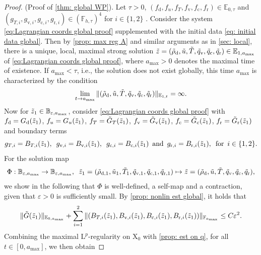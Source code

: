 \documentclass[10pt]{amsart}
\theoremstyle{plain}
\theoremstyle{definition}
\theoremstyle{thm}
\numberwithin{equation}{section}
\newcommand{\rL}{\mathrm{L}}
\newcommand{\rLp}{\rL^p}
\newcommand{\rX}{\mathrm{X}}
\newcommand{\E}{\mathbb{E}}
\newcommand{\F}{\mathbb{F}}
\newcommand{\eps}{\varepsilon}
\newcommand{\tand}{\enspace \text{and} \enspace}
\newcommand{\tfor}{\enspace \text{for} \enspace}
\newcommand{\rd}{\mathrm{d}}
\newcommand{\rr}{\mathrm{r}}
\newcommand{\rv}{\mathrm{v}}
\newcommand{\rc}{\mathrm{c}}
\newcommand{\trho}{\Tilde{\rho}}
\newcommand{\tu}{\Tilde{u}}
\newcommand{\tz}{\Tilde{z}}
\newcommand{\tT}{\Tilde{T}}
\newcommand{\tq}{\Tilde{q}}
\begin{document}
\begin{proof}{(Proof of \autoref{thm: global WP}).}
Let $\tau>0$, $(f_\rd, f_u, f_T,f_\rv,f_\rc,f_\rr) \in \E_{0,\tau}$ and $(g_{T,i},g_{\rv,i},g_{\rc,i},g_{\rr,i}) \in (\F_{h,\tau})^4$ for $i \in \{1,2\}$ . 
Consider the system \eqref{eq:Lagrangian coords global proof}  supplemented with the initial data \eqref{eq: initial data global}. 
Then by \autoref{prop: max reg A} and similar arguments as in \autoref{sec: local}, there is a unique, local, maximal strong solution $\tz = (\trho_\rd,\tu,\tT,\tq_\rv,\tq_\rc,\tq_\rr) \in \E_{1,a_\mathrm{max}}$ of \eqref{eq:Lagrangian coords global proof}, where $a_{\mathrm{max}}>0$ denotes the maximal time of existence. 
If $a_{\mathrm{max}} < \tau$, i.e., the solution does not exist globally, this time $a_{\mathrm{max}}$ is characterized by the condition
\begin{equation*}
    \lim\limits_{t \to a_{\mathrm{max}}} \| (\trho_\rd,\tu,\tT,\tq_\rv,\tq_\rc,\tq_\rr) \|_{\E_{1,t}} = \infty.
\end{equation*}
Now for $\tz_1 \in \mathbb{B}_{\eps,a_{\mathrm{max}}} $, consider \eqref{eq:Lagrangian coords global proof} with $f_{\rd} = G_\rd(\tz_1)$, $f_{u} = G_u(\tz_1)$, $f_T = \Tilde{G}_T(\tz_1)$, $f_\rv = \Tilde{G}_\rv(\tz_1)$, $f_\rc = \Tilde{G}_{\rc}(\tz_1)$, $f_\rr = \Tilde{G}_\rr(\tz_1)$ and boundary terms 
\begin{equation*}
    g_{T,i} = B_{T,i}(\tz_1), \enspace g_{\rv,i} = B_{\rv,i}(\tz_1), \enspace g_{\rc,i} = B_{\rc,i}(\tz_1) \tand g_{\rr,i} = B_{\rr,i}(\tz_1), \tfor i \in \{1,2\}.
\end{equation*}
For the solution map 
\begin{equation*}
    \Phi : \mathbb{B}_{\eps,a_{\mathrm{max}}} \to \mathbb{B}_{\eps,a_{\mathrm{max}}}, \enspace \tz_1=(\trho_{\rd,1},\tu_1,\tT_1,\tq_{\rv,1},\tq_{\rc,1},\tq_{\rr,1})  \mapsto \tz =(\trho_\rd,\tu,\tT,\tq_\rv,\tq_\rc,\tq_\rr),
\end{equation*} 
we show in the following that $\Phi$ is well-defined, a self-map and a contraction, given that $\eps>0$ is sufficiently small. 
By \autoref{prop: nonlin est global}, it holds that  
\begin{equation*}
    \| \Tilde{G}(\tz_1) \|_{\E_{0,a_{\mathrm{max}}}} + \sum_{i=1}^2 \| (B_{T,i}(\tz_1), B_{\rv,i}(\tz_1),B_{\rc,i}(\tz_1), B_{\rr,i}(\tz_1)) \|_{\F_{a_\mathrm{max}}} \leq C\eps^2.
\end{equation*}
Combining the maximal $\rLp$-regularity on $\rX_0$ with \autoref{prop: est on q}, for all $t \in [0,a_{\mathrm{max}}]$, we then obtain

\end{proof}
\end{document}
